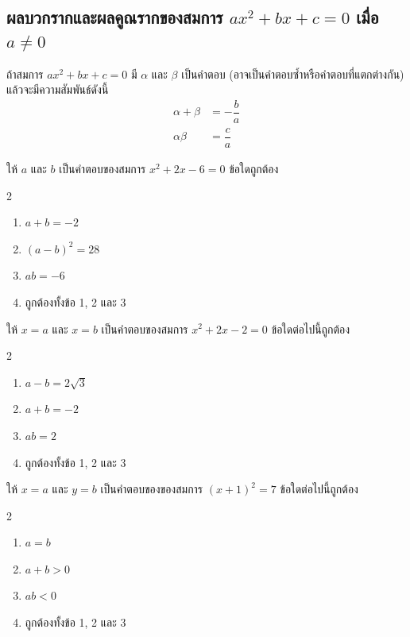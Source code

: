 \subsection{ผลบวกรากและผลคูณรากของสมการ $ax^2+bx+c=0$ เมื่อ $a\neq 0$}
\begin{remarkbox}
ถ้าสมการ $ax^2+bx+c=0$ มี $\alpha$ และ $\beta$ เป็นคำตอบ  
(อาจเป็นคำตอบซ้ำหรือคำตอบที่แตกต่างกัน) แล้วจะมีความสัมพันธ์ดังนี้
\begin{align*}
 \alpha+\beta &=-\dfrac{b}{a}\\
 \alpha\beta &=\dfrac{c}{a}
\end{align*}
\end{remarkbox}


\begin{examplebox}
ให้ $a$ และ $b$ เป็นคำตอบของสมการ $x^2+2 x-6=0$ ข้อใดถูกต้อง
\begin{multicols}{2}
\begin{enumerate}
\item $a+b=-2$
\item $(a-b)^2=28$
\item $a b=-6$
\item ถูกต้องทั้งข้อ 1, 2 และ 3
\end{enumerate}
\end{multicols}
\end{examplebox}

\newpage
\begin{examplebox}
ให้ $x=a$ และ $x=b$ เป็นคำตอบของสมการ $x^2+2 x-2=0$ ข้อใดต่อไปนี้ถูกต้อง
\begin{multicols}{2}
\begin{enumerate}
\item $a-b=2 \sqrt{3}$
\item $a+b=-2$
\item $a b=2$
\item ถูกต้องทั้งข้อ 1, 2 และ 3
\end{enumerate}
\end{multicols}
\end{examplebox}

\newpage
\begin{examplebox}
ให้ $x=a$ และ $y=b$ เป็นคำตอบของของสมการ $(x+1)^2=7$ ข้อใดต่อไปนี้ถูกต้อง
\begin{multicols}{2}
\begin{enumerate}
\item $a=b$
\item $a+b>0$
\item $a b<0$
\item ถูกต้องทั้งข้อ 1, 2 และ 3
\end{enumerate}
\end{multicols}
\end{examplebox}

